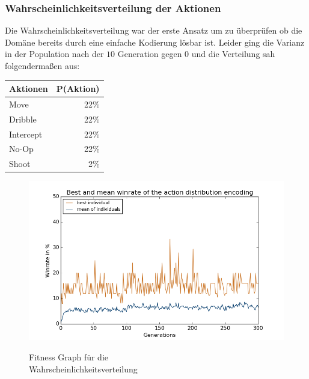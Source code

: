             \subsubsection*{Wahrscheinlichkeitsverteilung der Aktionen}
                \begin{multicols}{2}
                    \noindent
                    Die Wahrscheinlichkeitsverteilung war der erste Ansatz um zu überprüfen ob die Domäne bereits durch eine einfache Kodierung lösbar ist. Leider ging die Varianz in der Population nach der $10$ Generation gegen $0$ und die Verteilung sah folgendermaßen aus:
                    \begin{table}[H]
                        \begin{center}
                        \begin{tabular}{ |l|r| } 
                            \hline
                            \hfill Aktionen & P(Aktion)  \\ \hline
                            Move      & 22\% \\ \hline
                            Dribble   & 22\% \\ \hline
                            Intercept & 22\% \\ \hline
                            No-Op     & 22\% \\ \hline
                            Shoot     &  2\% \\ \hline
                        \end{tabular}
                        \end{center}
                    \end{table}

                    \begin{figure}[H]
                        \centering
                        \includegraphics[scale=0.5]{../pictures/summary/actiondist-fitness.png}\\
                        \caption{Fitness Graph für die \\Wahrscheinlichkeitsverteilung}\label{fig:graph-ac}
                    \end{figure}
                \end{multicols}
